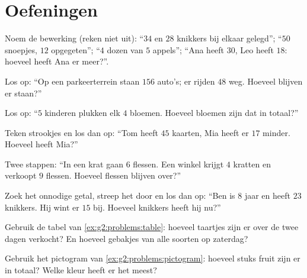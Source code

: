 \section{Oefeningen}

\begin{exercise}[$\star$]\label{exo:g2:problems:1}
Noem de bewerking (reken niet uit): ``$34$ en $28$ knikkers bij elkaar
gelegd''; ``$50$ snoepjes, $12$ opgegeten''; ``$4$ dozen van $5$
appels''; ``Ana heeft $30$, Leo heeft $18$: hoeveel heeft Ana er
meer?''.
\end{exercise}

\begin{exercise}[$\star$]\label{exo:g2:problems:2}
Los op: ``Op een parkeerterrein staan $156$ auto's; er rijden $48$ weg.
Hoeveel blijven er staan?''
\end{exercise}

\begin{exercise}[$\star$]\label{exo:g2:problems:3}
Los op: ``$5$ kinderen plukken elk $4$ bloemen. Hoeveel bloemen zijn
dat in totaal?''
\end{exercise}

\begin{exercise}[$\star$]\label{exo:g2:problems:4}
Teken strookjes en los dan op: ``Tom heeft $45$ kaarten, Mia heeft er
$17$ minder. Hoeveel heeft Mia?''
\end{exercise}

\begin{exercise}[$\star$]\label{exo:g2:problems:5}
Twee stappen: ``In een krat gaan $6$ flessen. Een winkel krijgt $4$
kratten en verkoopt $9$ flessen. Hoeveel flessen blijven over?''
\end{exercise}

\begin{exercise}[$\star$]\label{exo:g2:problems:6}
Zoek het onnodige getal, streep het door en los dan op: ``Ben is $8$
jaar en heeft $23$ knikkers. Hij wint er $15$ bij. Hoeveel knikkers
heeft hij nu?''
\end{exercise}

\begin{exercise}[$\star$]\label{exo:g2:problems:7}
Gebruik de tabel van \cref{ex:g2:problems:table}: hoeveel taartjes zijn
er over de twee dagen verkocht? En hoeveel gebakjes van alle soorten op
zaterdag?
\end{exercise}

\begin{exercise}[$\star$]\label{exo:g2:problems:8}
Gebruik het pictogram van \cref{ex:g2:problems:pictogram}: hoeveel
stuks fruit zijn er in totaal? Welke kleur heeft er het meest?
\end{exercise}

